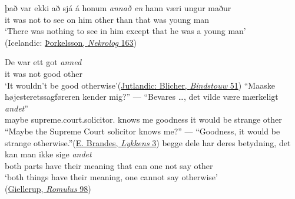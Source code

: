 \ea \label{ex:07-86a}
\gll það var ekki að sjá á honum \emph{annað} \emph{en} hann væri ungur maður\\
 it was not to see on him other than that was young man\\
\glt `There was nothing to see in him except that he was a young man'\\\hfill(Icelandic: \href{https://runeberg.org/anf/1890/0167.html}{Þorkelsson, \textit{Nekrolog} 163}) %
\z

\ea \label{ex:07-86b}
\ea
\gll De war ett got \emph{anned}\\ %
 it was not good other\\
\glt `It wouldn't be good otherwise'\hfill(\href{https://books.google.co.jp/books?id=zggQAQAAIAAJ&printsec=frontcover&dq=inauthor:%22Steen+Steensen+Blicher%22&hl=ja&newbks=1&newbks_redir=0&sa=X&redir_esc=y#v=snippet&q=%22de%20war%20ett%20godt%22&f=false}{Jutlandic: Blicher, \textit{Bindstouw} 51})
\ex 
\gll ``Maaske højesteretssagføreren kender mig?'' --- ``Bevares {\dots}, det vilde være mærkeligt \emph{andet}''\\
 maybe supreme.court.solicitor.\DEF{} knows me {} goodness {} it would be strange other\\ %
\glt ``Maybe the Supreme Court solicitor knows me?'' --- ``Goodness, it would be strange otherwise.''\hfill(\href{https://tekster.kb.dk/text/adl-texts-brandesed_05-root}{E. Brandes, \textit{Lykkens} 3})
\ex 
\gll begge dele har deres betydning, det kan man ikke sige \emph{andet}\\ %
 both parts have their meaning that can one not say other\\
\glt `both things have their meaning, one cannot say otherwise'\\\hfill(\href{https://books.google.co.jp/books?redir_esc=y&hl=ja&id=G0ARAQAAMAAJ&q=begge+delle+har+deres#v=onepage&q=begge&f=false}{Giellerup, \textit{Romulus} 98})
